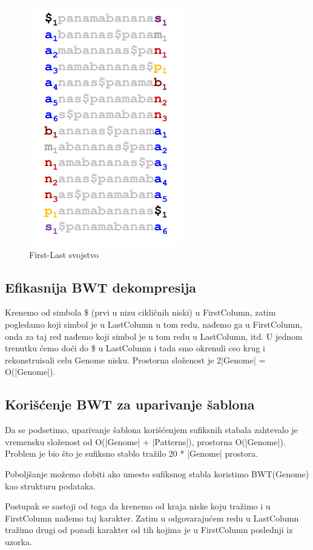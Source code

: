 \begin{figure}[h!]
\centering
\includegraphics[scale=0.6]{poglavlja/9/slike/firstLast.png}
\caption{First-Last svojstvo}
\label{slika:X}
\end{figure}

\subsection{Efikasnija BWT dekompresija}

Krenemo od simbola \$ (prvi u nizu cikličnih niski) u FirstColumn, zatim pogledamo koji simbol je u LastColumn u tom redu, nađemo ga u FirstColumn, onda za taj red nađemo koji simbol je u tom redu u LastColumn, itd. U jednom trenutku ćemo doći do \$ u LastColumn i tada smo okrenuli ceo krug i rekonstruisali celu Genome nisku.
Prostorna složenost je 2|Genome| = O(|Genome|).


\subsection{Korišćenje BWT za uparivanje šablona}

Da se podsetimo, uparivanje šablona korišćenjem sufiksnih stabala zahtevalo je vremensku složenost od O(|Genome| + |Patterns|), prostorna O(|Genome|). Problem je bio što je sufiksno stablo tražilo 20 * |Genome| prostora.

Poboljšanje možemo dobiti ako umesto sufiksnog stabla koristimo BWT(Genome) kao strukturu podataka.

Postupak se sastoji od toga da krenemo od kraja niske koju tražimo i u FirstColumn nađemo taj karakter. Zatim u odgovarajućem redu u LastColumn tražimo drugi od pozadi karakter od tih kojima je u FirstColumn poslednji iz uzorka.

